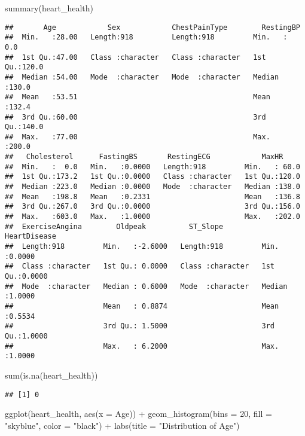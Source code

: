 \documentclass[
]{article}
\newenvironment{Shaded}{\begin{snugshade}}{\end{snugshade}}
\newcommand{\AttributeTok}[1]{\textcolor[rgb]{0.77,0.63,0.00}{#1}}
\newcommand{\DecValTok}[1]{\textcolor[rgb]{0.00,0.00,0.81}{#1}}
\newcommand{\FunctionTok}[1]{\textcolor[rgb]{0.00,0.00,0.00}{#1}}
\newcommand{\NormalTok}[1]{#1}
\newcommand{\SpecialCharTok}[1]{\textcolor[rgb]{0.00,0.00,0.00}{#1}}
\newcommand{\StringTok}[1]{\textcolor[rgb]{0.31,0.60,0.02}{#1}}
\begin{document}
\begin{Shaded}
\begin{Highlighting}[]
\FunctionTok{summary}\NormalTok{(heart\_health)}
\end{Highlighting}
\end{Shaded}

\begin{verbatim}
##       Age            Sex            ChestPainType        RestingBP    
##  Min.   :28.00   Length:918         Length:918         Min.   :  0.0  
##  1st Qu.:47.00   Class :character   Class :character   1st Qu.:120.0  
##  Median :54.00   Mode  :character   Mode  :character   Median :130.0  
##  Mean   :53.51                                         Mean   :132.4  
##  3rd Qu.:60.00                                         3rd Qu.:140.0  
##  Max.   :77.00                                         Max.   :200.0  
##   Cholesterol      FastingBS       RestingECG            MaxHR      
##  Min.   :  0.0   Min.   :0.0000   Length:918         Min.   : 60.0  
##  1st Qu.:173.2   1st Qu.:0.0000   Class :character   1st Qu.:120.0  
##  Median :223.0   Median :0.0000   Mode  :character   Median :138.0  
##  Mean   :198.8   Mean   :0.2331                      Mean   :136.8  
##  3rd Qu.:267.0   3rd Qu.:0.0000                      3rd Qu.:156.0  
##  Max.   :603.0   Max.   :1.0000                      Max.   :202.0  
##  ExerciseAngina        Oldpeak          ST_Slope          HeartDisease   
##  Length:918         Min.   :-2.6000   Length:918         Min.   :0.0000  
##  Class :character   1st Qu.: 0.0000   Class :character   1st Qu.:0.0000  
##  Mode  :character   Median : 0.6000   Mode  :character   Median :1.0000  
##                     Mean   : 0.8874                      Mean   :0.5534  
##                     3rd Qu.: 1.5000                      3rd Qu.:1.0000  
##                     Max.   : 6.2000                      Max.   :1.0000
\end{verbatim}

\begin{Shaded}
\begin{Highlighting}[]
\FunctionTok{sum}\NormalTok{(}\FunctionTok{is.na}\NormalTok{(heart\_health))}
\end{Highlighting}
\end{Shaded}

\begin{verbatim}
## [1] 0
\end{verbatim}

\begin{Shaded}
\begin{Highlighting}[]
\FunctionTok{ggplot}\NormalTok{(heart\_health, }\FunctionTok{aes}\NormalTok{(}\AttributeTok{x =}\NormalTok{ Age)) }\SpecialCharTok{+} 
  \FunctionTok{geom\_histogram}\NormalTok{(}\AttributeTok{bins =} \DecValTok{20}\NormalTok{, }\AttributeTok{fill =} \StringTok{"skyblue"}\NormalTok{, }\AttributeTok{color =} \StringTok{"black"}\NormalTok{) }\SpecialCharTok{+} 
  \FunctionTok{labs}\NormalTok{(}\AttributeTok{title =} \StringTok{"Distribution of Age"}\NormalTok{)}
\end{Highlighting}
\end{Shaded}
\end{document}
